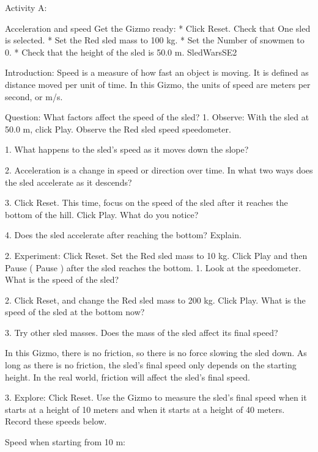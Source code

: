 Activity A: 


Acceleration and speed
	Get the Gizmo ready: 
      * Click Reset. Check that One sled is selected.
      * Set the Red sled mass to 100 kg.
      * Set the Number of snowmen to 0.
      * Check that the height of the sled is 50.0 m.
	 SledWarsSE2 

	

Introduction: Speed is a measure of how fast an object is moving. It is defined as distance moved per unit of time. In this Gizmo, the units of speed are meters per second, or m/s.


Question: What factors affect the speed of the sled?
      1. Observe: With the sled at 50.0 m, click Play. Observe the Red sled speed speedometer. 


      1. What happens to the sled’s speed as it moves down the slope?
	

	      2. Acceleration is a change in speed or direction over time. In what two ways does the sled accelerate as it descends?
	

	      3. Click Reset. This time, focus on the speed of the sled after it reaches the bottom of the hill. Click Play. What do you notice?
	

	      4. Does the sled accelerate after reaching the bottom? Explain.
	

	

      2. Experiment: Click Reset. Set the Red sled mass to 10 kg. Click Play and then Pause ( Pause ) after the sled reaches the bottom.
         1. Look at the speedometer. What is the speed of the sled?
	

	         2. Click Reset, and change the Red sled mass to 200 kg. Click Play. What is the speed of the sled at the bottom now?
	

	         3. Try other sled masses. Does the mass of the sled affect its final speed?
	

	

In this Gizmo, there is no friction, so there is no force slowing the sled down. As long as there is no friction, the sled’s final speed only depends on the starting height. In the real world, friction will affect the sled’s final speed.


         3. Explore: Click Reset. Use the Gizmo to measure the sled’s final speed when it starts at a height of 10 meters and when it starts at a height of 40 meters. Record these speeds below.


Speed when starting from 10 m: 
	

